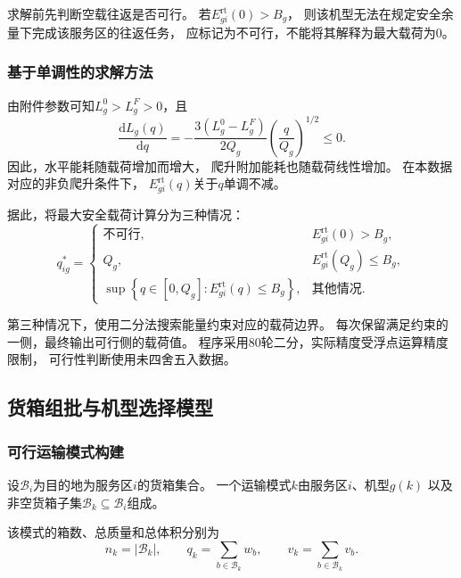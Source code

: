 \documentclass[bwprint]{gmcmthesis}
\begin{document}
求解前先判断空载往返是否可行。
若$E_{gi}^{\mathrm{rt}}(0)>B_g$，
则该机型无法在规定安全余量下完成该服务区的往返任务，
应标记为不可行，不能将其解释为最大载荷为0。

\subsubsection{基于单调性的求解方法}

由附件参数可知$L_g^0>L_g^F>0$，且
\begin{equation}
    \frac{\mathrm{d}L_g(q)}{\mathrm{d}q}
    =
    -\frac{3(L_g^0-L_g^F)}{2Q_g}
    \left(\frac{q}{Q_g}\right)^{1/2}
    \leq 0.
\end{equation}
因此，水平能耗随载荷增加而增大，
爬升附加能耗也随载荷线性增加。
在本数据对应的非负爬升条件下，
$E_{gi}^{\mathrm{rt}}(q)$关于$q$单调不减。

据此，将最大安全载荷计算分为三种情况：
\begin{equation}
    q_{ig}^{*}
    =
    \begin{cases}
        \text{不可行},
        &E_{gi}^{\mathrm{rt}}(0)>B_g,\\[3pt]
        Q_g,
        &E_{gi}^{\mathrm{rt}}(Q_g)\leq B_g,\\[3pt]
        \displaystyle
        \sup\left\{q\in[0,Q_g]:
        E_{gi}^{\mathrm{rt}}(q)\leq B_g\right\},
        &\text{其他情况}.
    \end{cases}
\end{equation}

第三种情况下，使用二分法搜索能量约束对应的载荷边界。
每次保留满足约束的一侧，最终输出可行侧的载荷值。
程序采用80轮二分，实际精度受浮点运算精度限制，
可行性判断使用未四舍五入数据。

\subsection{货箱组批与机型选择模型}

\subsubsection{可行运输模式构建}

设$\mathcal{B}_i$为目的地为服务区$i$的货箱集合。
一个运输模式$k$由服务区$i$、机型$g(k)$
以及非空货箱子集$\mathcal{B}_k\subseteq\mathcal{B}_i$组成。

该模式的箱数、总质量和总体积分别为
\begin{equation}
    n_k=|\mathcal{B}_k|,
    \qquad
    q_k=\sum_{b\in\mathcal{B}_k}w_b,
    \qquad
    v_k=\sum_{b\in\mathcal{B}_k}v_b.
\end{equation}
\end{document}
